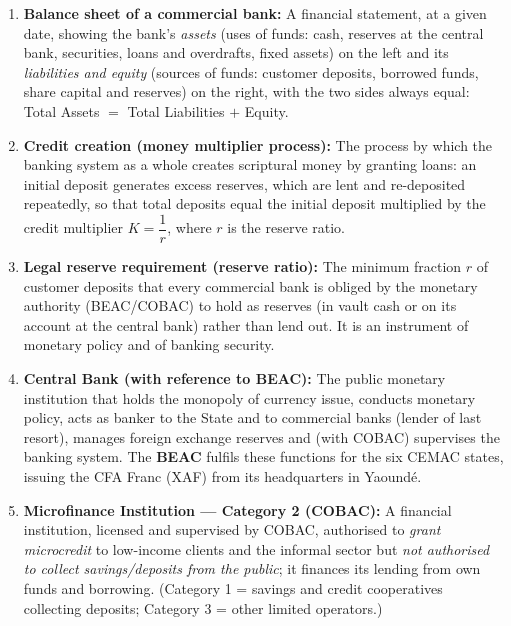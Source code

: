 \documentclass[11pt]{article}
\begin{document}
\begin{corrige}

\begin{enumerate}
\item \textbf{Balance sheet of a commercial bank:} A financial statement, at a given date, showing the bank's \emph{assets} (uses of funds: cash, reserves at the central bank, securities, loans and overdrafts, fixed assets) on the left and its \emph{liabilities and equity} (sources of funds: customer deposits, borrowed funds, share capital and reserves) on the right, with the two sides always equal: Total Assets $=$ Total Liabilities $+$ Equity.

\item \textbf{Credit creation (money multiplier process):} The process by which the banking system as a whole creates scriptural money by granting loans: an initial deposit generates excess reserves, which are lent and re-deposited repeatedly, so that total deposits equal the initial deposit multiplied by the credit multiplier $K = \dfrac{1}{r}$, where $r$ is the reserve ratio.

\item \textbf{Legal reserve requirement (reserve ratio):} The minimum fraction $r$ of customer deposits that every commercial bank is obliged by the monetary authority (BEAC/COBAC) to hold as reserves (in vault cash or on its account at the central bank) rather than lend out. It is an instrument of monetary policy and of banking security.

\item \textbf{Central Bank (with reference to BEAC):} The public monetary institution that holds the monopoly of currency issue, conducts monetary policy, acts as banker to the State and to commercial banks (lender of last resort), manages foreign exchange reserves and (with COBAC) supervises the banking system. The \textbf{BEAC} fulfils these functions for the six CEMAC states, issuing the CFA Franc (XAF) from its headquarters in Yaoundé.

\item \textbf{Microfinance Institution — Category 2 (COBAC):} A financial institution, licensed and supervised by COBAC, authorised to \emph{grant microcredit} to low-income clients and the informal sector but \emph{not authorised to collect savings/deposits from the public}; it finances its lending from own funds and borrowing. (Category 1 = savings and credit cooperatives collecting deposits; Category 3 = other limited operators.)


\end{enumerate}
\end{corrige}
\end{document}

